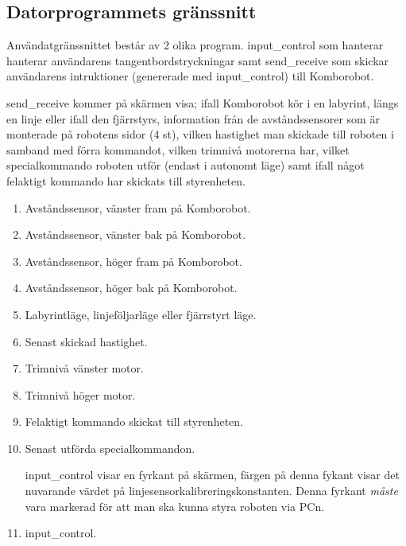 
\subsection{Datorprogrammets gränssnitt}

Användatgränssnittet består av 2 olika program. input\_control som hanterar
hanterar användarens tangentbordstryckningar samt send\_receive som skickar
användarens intruktioner (genererade med input\_control) till Komborobot.


send\_receive kommer på skärmen visa; ifall Komborobot kör i en labyrint, längs en linje eller ifall
den fjärrstyrs, information från de avståndssensorer som är monterade på
robotens sidor (4 st), vilken hastighet man skickade till roboten i samband med
förra kommandot, vilken trimnivå motorerna har, vilket specialkommando roboten
utför (endast i autonomt läge) samt ifall något felaktigt kommando har skickats
till styrenheten.

\begin{enumerate}
\item Avståndssensor, vänster fram på Komborobot.
\item Avståndssensor, vänster bak på Komborobot.
\item Avståndssensor, höger fram på Komborobot.
\item Avståndssensor, höger bak på Komborobot.
\item Labyrintläge, linjeföljarläge eller fjärrstyrt läge.
\item Senast skickad hastighet.
\item Trimnivå vänster motor.
\item Trimnivå höger motor.
\item Felaktigt kommando skickat till styrenheten.
\item Senast utförda specialkommandon.

input\_control visar en fyrkant på skärmen, färgen på denna fykant visar det
nuvarande värdet på linjesensorkalibreringskonstanten. Denna fyrkant
\emph{måste} vara markerad för att man ska kunna styra roboten via PCn.

\item input\_control.

\end{enumerate}
